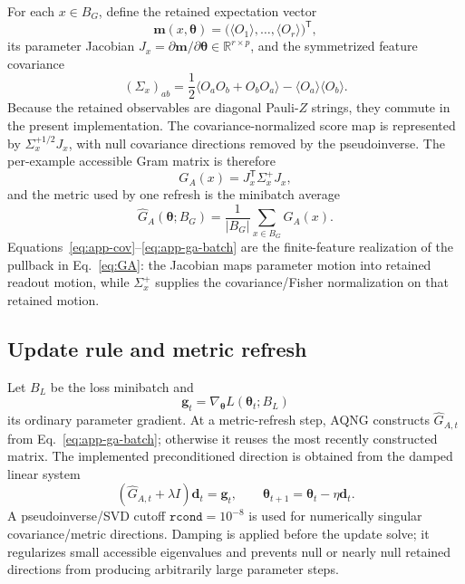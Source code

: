 For each $x\in B_G$, define the retained expectation vector
\begin{equation}
 \bm m(x,\bm\theta)=\big(\langle O_1\rangle,\ldots,\langle O_r\rangle\big)^{\mathsf T},
\end{equation}
its parameter Jacobian $J_x=\partial\bm m/\partial\bm\theta\in\mathbb R^{r\times p}$, and the symmetrized feature covariance
\begin{equation}
 (\Sigma_x)_{ab}=\frac12\langle O_aO_b+O_bO_a\rangle-\langle O_a\rangle\langle O_b\rangle.
 \label{eq:app-cov}
\end{equation}
Because the retained observables are diagonal Pauli-$Z$ strings, they commute in the present implementation.  The covariance-normalized score map is represented by $\Sigma_x^{+1/2}J_x$, with null covariance directions removed by the pseudoinverse.  The per-example accessible Gram matrix is therefore
\begin{equation}
 G_A(x)=J_x^{\mathsf T}\Sigma_x^{+}J_x,
 \label{eq:app-ga-single}
\end{equation}
and the metric used by one refresh is the minibatch average
\begin{equation}
 \widehat G_A(\bm\theta;B_G)=\frac{1}{|B_G|}\sum_{x\in B_G}G_A(x).
 \label{eq:app-ga-batch}
\end{equation}
Equations~\eqref{eq:app-cov}--\eqref{eq:app-ga-batch} are the finite-feature realization of the pullback in Eq.~\eqref{eq:GA}: the Jacobian maps parameter motion into retained readout motion, while $\Sigma_x^{+}$ supplies the covariance/Fisher normalization on that retained motion.

\subsection{Update rule and metric refresh}
Let $B_L$ be the loss minibatch and
\begin{equation}
 \bm g_t=\nabla_{\bm\theta}L(\bm\theta_t;B_L)
\end{equation}
its ordinary parameter gradient.  At a metric-refresh step, AQNG constructs $\widehat G_{A,t}$ from Eq.~\eqref{eq:app-ga-batch}; otherwise it reuses the most recently constructed matrix.  The implemented preconditioned direction is obtained from the damped linear system
\begin{equation}
 (\widehat G_{A,t}+\lambda I)\bm d_t=\bm g_t,
 \qquad
 \bm\theta_{t+1}=\bm\theta_t-\eta\bm d_t.
 \label{eq:app-update}
\end{equation}
A pseudoinverse/SVD cutoff $\texttt{rcond}=10^{-8}$ is used for numerically singular covariance/metric directions.  Damping is applied before the update solve; it regularizes small accessible eigenvalues and prevents null or nearly null retained directions from producing arbitrarily large parameter steps.


